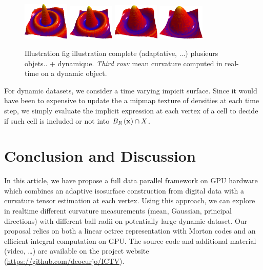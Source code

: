 \documentclass{llncs}
\begin{document}
\begin{figure}
\begin{center}
    {\includegraphics[width=2.2cm]{figs/function_mean_1}}
    {\includegraphics[width=2.2cm]{figs/function_mean_2}}
    {\includegraphics[width=2.2cm]{figs/function_mean_3}}
    {\includegraphics[width=2.2cm]{figs/function_mean_4}}
  \end{center}
  \caption{Illustration fig illustration complete (adaptative, ...) plusieurs
    objets.. + dynamique.
    \emph{Third row:} mean curvature computed in real-time on a dynamic object.}
  \label{fig:full}
\end{figure}


For dynamic datasets, we consider a time varying impicit
surface. Since it would have been to expensive to update the a mipmap texture
of densities at each time step, we simply evaluate the implicit
expression at each vertex of a cell to decide if such cell is included
or not into $B_{R}\left(\mathbf{x}\right)\cap X$.



\section{Conclusion and Discussion}
\label{sec:discussion}

In this article, we have propose a full data parallel framework on GPU
hardware which combines an adaptive isosurface construction from
digital data with a curvature tensor estimation at each vertex. Using
this approach, we can explore in realtime different curvature
measurements (mean, Gaussian, principal directions) with different
ball radii on potentially large dynamic dataset. Our proposal relies
on both a linear octree representation with Morton codes and an
efficient integral computation on GPU.  The source code and additional
material (video, \ldots) are available on the project website
(\url{https://github.com/dcoeurjo/ICTV}).
\end{document}
